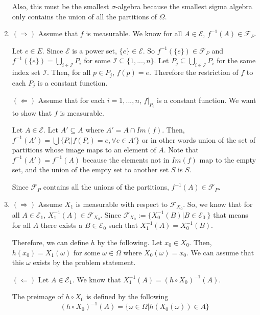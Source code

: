 \documentclass[12pt]{article}
\begin{document}
\begin{enumerate}[start=1,label={\bfseries Problem \arabic*:},leftmargin=1in]
    Also, this must be the smallest $\sigma$-algebra because the smallest sigma algebra only contains the union of all the partitions of $\Omega$. 
    \item $(\Rightarrow)$ Assume that $f$ is measurable. We know for all $A \in \mathcal{E}$, $f^{-1}(A) \in \mathcal{F}_{P}$.

    Let $e \in E$. Since $\mathcal{E}$ is a power set, $\{e\} \in \mathcal{E}$. 
    So $f^{-1}(\{e\}) \in \mathcal{F}_{P}$ and $f^{-1}(\{e\}) = \bigcup_{i\in \mathcal{I}} P_i$ for some $\mathcal{I} \subseteq \{ 1, ..., n\}$. 
    Let $P_j \subseteq \bigcup_{i\in \mathcal{I}} P_i$ for the same index set $\mathcal{I}$. Then, for all $p \in P_j$, $f(p) = e$. 
    Therefore the restriction of $f$ to each $P_j$ is a constant function. 


    $(\Leftarrow)$ Assume that for each $i = 1, ..., n$, $f|_{P_i}$ is a constant function. We want to show that $f$ is measurable. 
    
    Let $A \in \mathcal{E}$. Let $A' \subseteq A$ where $A' = A \cap Im(f)$. Then, $f^{-1}(A') = \bigcup  \{ P_i | f(P_i) = e, \forall e \in A' \}$ or in other words 
    union of the set of partitions whose image maps to an element of $A$. 
    Note that $f^{-1}(A') = f^{-1}(A)$ because the elements not in $Im(f)$ map to the empty set, and the union of the empty set to another set $S$ is $S$. 

    Since $\mathcal{F}_P$ contains all the unions of the partitions, $f^{-1}(A) \in \mathcal{F}_P$.


    \item $(\Rightarrow)$ Assume $X_{1}$ is measurable with respect to $\mathcal{F}_{X_{0}}$. 
    So, we know that for all $A \in \mathcal{E}_{1}$, $X_{1}^{-1}(A) \in \mathcal{F}_{X_{0}}$. 
    Since $\mathcal{F}_{X_{0}} := \{X_{0}^{-1}(B) | B \in \mathcal{E}_{0}\ \}$ that means 
    for all $A$ there exists a $B \in \mathcal{E}_{0}$ such that $X_{1}^{-1}(A) = X_{0}^{-1}(B)$. 
    
    Therefore, we can define $h$ by the following. Let $x_{0} \in X_{0}$. 
    Then, $h(x_{0}) = X_{1}(\omega)$ for some $\omega \in \Omega$ where $X_{0}(\omega) = x_{0}$. We can assume that this $\omega$ exists by the problem statement. 

    $(\Leftarrow)$ Let $A \in \mathcal{E}_{1}$. We know that $X_{1}^{-1}(A) = (h\circ X_{0})^{-1}(A)$. 
    
    The preimage of $h\circ X_{0}$ is defined by the following 
    \[
        (h\circ X_{0})^{-1}(A) = \{ \omega \in \Omega | h(X_{0}(\omega)) \in A \}
    \]


\end{enumerate}
\end{document}
